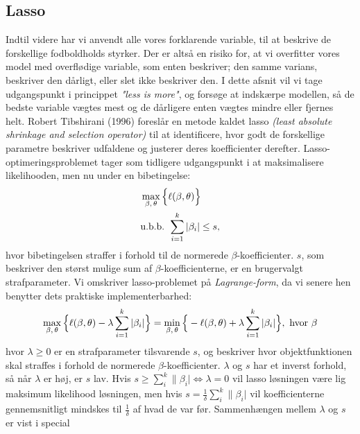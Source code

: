 \documentclass[11pt,a4paper]{article}
\begin{document}
\subsection{Lasso}
Indtil videre har vi anvendt alle vores forklarende variable, til at beskrive de forskellige fodboldholds styrker. Der er altså en risiko for, at vi overfitter vores model med overflødige variable, som enten beskriver; den samme varians, beskriver den dårligt, eller slet ikke beskriver den. I dette afsnit vil vi tage udgangspunkt i princippet \textit{"less is more"}, og forsøge at indskærpe modellen, så de bedste variable vægtes mest og de dårligere enten vægtes mindre eller fjernes helt. Robert Tibshirani (1996)\cite{RobertTibshirani} foreslår en metode kaldet lasso \textit{(least absolute shrinkage and selection operator)} til at identificere, hvor godt de forskellige parametre beskriver udfaldene og justerer deres koefficienter derefter. Lasso-optimeringsproblemet tager som tidligere udgangspunkt i at maksimalisere likelihooden, men nu under en bibetingelse:
\begin{align*}
&\max_{\beta,\,\theta} \Big{\{}\ell(\beta,\theta)\Big{\}} \\
&\text{u.b.b. }\sum_{i=1}^k|\beta_i|\leq s,
\end{align*}
hvor bibetingelsen straffer i forhold til de normerede $\beta$-koefficienter. $s$, som beskriver den størst mulige sum af $\beta$-koefficienterne, er en brugervalgt strafparameter. 
Vi omskriver lasso-problemet på \textit{Lagrange-form}, da vi senere hen benytter dets praktiske implementerbarhed:
\begin{align*}
\max_{\beta,\,\theta} \Big{\{}\ell(\beta,\theta)-\lambda\sum_{i=1}^k|\beta_i|\Big{\}}=\min_{\beta,\,\theta} \Big{\{}-\ell(\beta,\theta)+\lambda\sum_{i=1}^k|\beta_i|\Big{\}},\text{ hvor }\beta
\end{align*}
hvor $\lambda\geq0$ er en strafparameter tilsvarende $s$, og beskriver hvor objektfunktionen skal straffes i forhold de normerede $\beta$-koefficienter. $\lambda$ og $s$ har et inverst forhold, så når $\lambda$ er høj, er $s$ lav. Hvis $s\geq\sum_i^k\|\beta_i|\iff \lambda=0$ vil lasso løsningen være lig maksimum likelihood løsningen, men hvis $s=\frac{1}{\delta}\sum_i^k\|\beta_i|$ vil koefficienterne gennemsnitligt mindskes til $\frac{1}{\delta}$ af hvad de var før. Sammenhængen mellem $\lambda$ og $s$ er vist i special
\end{document}
